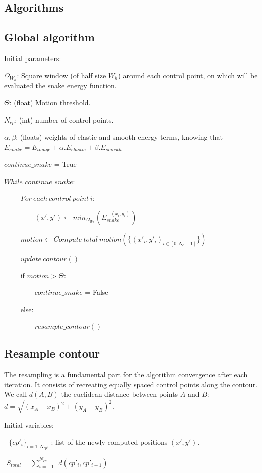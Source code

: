 \documentclass[24pt]{article}
\begin{document}
\newpage

\subsection{Algorithms}


\subsection{Global algorithm}


Initial parameters:


$\Omega_{W_h}$: Square window (of  half size $W_h$) around each control point,  on which will be evaluated the snake energy function. 

$\Theta$: (float) Motion threshold.
 
$N_{cp}$: (int) number of control points.
 
$\alpha, \beta$: (floats) weights of    
elastic  and smooth energy terms, knowing that $E_{snake} = E_{image} + \alpha.E_{elastic} + \beta.E_{smooth}$ 

$continue\_snake$ = True


$While$ $continue\_snake$:

~~~~	$For~ each~ control ~point~ i$:
	
~~~~~~~~	$(x',y') \leftarrow  min_{\Omega_{W_h}}( E_{snake}^{~~~~(x_i,y_i)} ) $


~~~~	$motion \leftarrow Compute ~total~motion (\{(x'_i,y'_i)_{i \in [0, N_c -1]} \})$

~~~~    $update ~contour()$

~~~~	if $motion >  \Theta$:

~~~~~~~~ $continue\_snake$ = False

~~~~    else:

~~~~~~~~ $resample\_contour()$


\subsection{Resample contour}
The resampling is a fundamental part for the algorithm convergence after each iteration. It consists of recreating equally spaced control points along the contour. We call $d(A,B)$ the euclidean distance between points $A$ and $B$: $d = \sqrt{(x_A-x_B)^2 + (y_A - y_B)^2}$.

Initial variables:

	- $\{cp'_i\}_{i= 1:N_{cp'}}$ : list of the newly computed positions $(x',y')$.

-$S_{total} = \sum_{i= -1}^{N_{cp'}}  ~~d(cp'_i , cp'_{i+1})$
\end{document}
